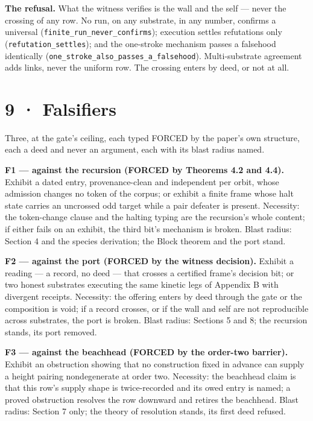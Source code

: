 \documentclass[10pt,twocolumn]{article}
\begin{document}
\textbf{The refusal.} What the witness verifies is the wall and the self
--- never the crossing of any row. No run, on any substrate, in any
number, confirms a universal (\texttt{finite\_run\_never\_confirms});
execution settles refutations only (\texttt{refutation\_settles}); and
the one-stroke mechanism passes a falsehood identically
(\texttt{one\_stroke\_also\_passes\_a\_falsehood}). Multi-substrate
agreement adds links, never the uniform row. The crossing enters by
deed, or not at all.

\section{9 · Falsifiers}\label{falsifiers}

Three, at the gate's ceiling, each typed FORCED by the paper's own
structure, each a deed and never an argument, each with its blast radius
named.

\textbf{F1 --- against the recursion (FORCED by Theorems 4.2 and 4.4).}
Exhibit a dated entry, provenance-clean and independent per orbit, whose
admission changes no token of the corpus; or exhibit a finite frame
whose halt state carries an uncrossed odd target while a pair defeater
is present. Necessity: the token-change clause and the halting typing
are the recursion's whole content; if either fails on an exhibit, the
third bit's mechanism is broken. Blast radius: Section 4 and the species
derivation; the Block theorem and the port stand.

\textbf{F2 --- against the port (FORCED by the witness decision).}
Exhibit a reading --- a record, no deed --- that crosses a certified
frame's decision bit; or two honest substrates executing the same
kinetic legs of Appendix B with divergent receipts. Necessity: the
offering enters by deed through the gate or the composition is void; if
a record crosses, or if the wall and self are not reproducible across
substrates, the port is broken. Blast radius: Sections 5 and 8; the
recursion stands, its port removed.

\textbf{F3 --- against the beachhead (FORCED by the order-two barrier).}
Exhibit an obstruction showing that no construction fixed in advance can
supply a height pairing nondegenerate at order two. Necessity: the
beachhead claim is that this row's supply shape is twice-recorded and
its owed entry is named; a proved obstruction resolves the row downward
and retires the beachhead. Blast radius: Section 7 only; the theory of
resolution stands, its first deed refused.
\end{document}
